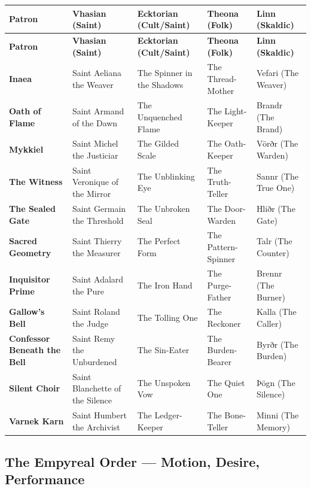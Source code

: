 \begin{longtable}{p{3cm}|p{2.8cm}|p{2.8cm}|p{2.8cm}|p{2.8cm}}
\toprule
\textbf{Patron} & \textbf{Vhasian (Saint)} & \textbf{Ecktorian (Cult/Saint)} & \textbf{Theona (Folk)} & \textbf{Linn (Skaldic)} \\
\midrule
\endfirsthead
\toprule
\textbf{Patron} & \textbf{Vhasian (Saint)} & \textbf{Ecktorian (Cult/Saint)} & \textbf{Theona (Folk)} & \textbf{Linn (Skaldic)} \\
\midrule
\endhead
\bottomrule
\endfoot
\textbf{Inaea} & Saint Aeliana the Weaver & The Spinner in the Shadows & The Thread-Mother & Vefari (The Weaver) \\
\textbf{Oath of Flame} & Saint Armand of the Dawn & The Unquenched Flame & The Light-Keeper & Brandr (The Brand) \\
\textbf{Mykkiel} & Saint Michel the Justiciar & The Gilded Scale & The Oath-Keeper & Vörðr (The Warden) \\
\textbf{The Witness} & Saint Veronique of the Mirror & The Unblinking Eye & The Truth-Teller & Sannr (The True One) \\
\textbf{The Sealed Gate} & Saint Germain the Threshold & The Unbroken Seal & The Door-Warden & Hliðr (The Gate) \\
\textbf{Sacred Geometry} & Saint Thierry the Measurer & The Perfect Form & The Pattern-Spinner & Talr (The Counter) \\
\textbf{Inquisitor Prime} & Saint Adalard the Pure & The Iron Hand & The Purge-Father & Brennr (The Burner) \\
\textbf{Gallow's Bell} & Saint Roland the Judge & The Tolling One & The Reckoner & Kalla (The Caller) \\
\textbf{Confessor Beneath the Bell} & Saint Remy the Unburdened & The Sin-Eater & The Burden-Bearer & Byrðr (The Burden) \\
\textbf{Silent Choir} & Saint Blanchette of the Silence & The Unspoken Vow & The Quiet One & Þögn (The Silence) \\
\textbf{Varnek Karn} & Saint Humbert the Archivist & The Ledger-Keeper & The Bone-Teller & Minni (The Memory) \\
\bottomrule
\end{longtable}

\subsection{The Empyreal Order --- Motion, Desire, Performance}

